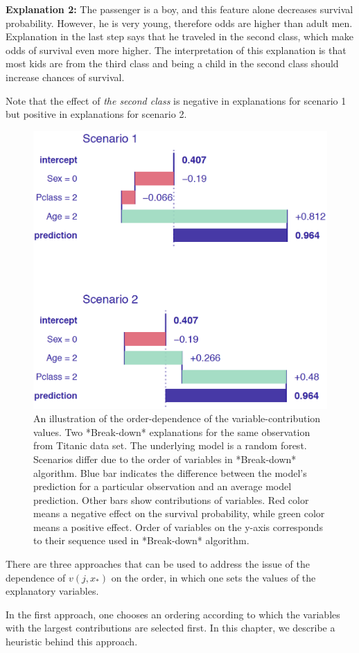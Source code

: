 \documentclass[12pt,]{krantz}
\begin{document}
\textbf{Explanation 2:}
The passenger is a boy, and this feature alone decreases survival probability.
However, he is very young, therefore odds are higher than adult men. Explanation in the last step says that he traveled in the second class, which make odds of survival even more higher. The interpretation of this explanation is that most kids are from the third class and being a child in the second class should increase chances of survival.

Note that the effect of \emph{the second class} is negative in explanations for scenario 1 but positive in explanations for scenario 2.

\begin{figure}

{\centering \includegraphics[width=0.5\linewidth]{figure/ordering} 

}

\caption{An illustration of the order-dependence of the variable-contribution values. Two *Break-down* explanations for the same observation from Titanic data set. The underlying model is a random forest. Scenarios differ due to the order of variables in *Break-down* algorithm. Blue bar indicates the difference between the model's prediction for a particular observation and an average model prediction. Other bars show contributions of variables. Red color means a negative effect on the survival probability, while green color means a positive effect. Order of variables on the y-axis corresponds to their sequence used in *Break-down* algorithm.}\label{fig:ordering}
\end{figure}

There are three approaches that can be used to address the issue of the dependence of \(v(j, x_*)\) on the order, in which one sets the values of the explanatory variables.

In the first approach, one chooses an ordering according to which the variables with the largest contributions are selected first. In this chapter, we describe a heuristic behind this approach.
\end{document}
